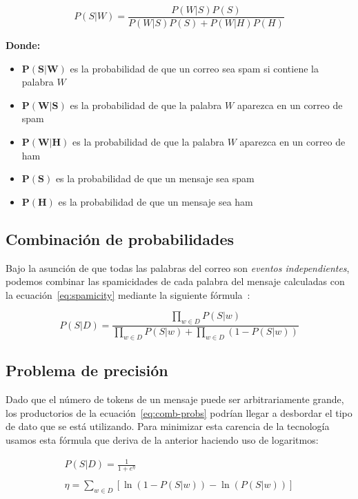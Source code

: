 \begin{equation}
	\label{eq:spamicity}
	P(S | W) = \frac{P(W | S) P(S)}{P(W | S) P(S) + P(W | H) P(H)}
\end{equation}

\textbf{Donde:}
\begin{itemize}
	\item $\bm{P(S | W)}$ es la probabilidad de que un correo sea spam si contiene la palabra $W$
	\item $\bm{P(W | S)}$ es la probabilidad de que la palabra $W$ aparezca en un correo de spam
	\item $\bm{P(W | H)}$ es la probabilidad de que la palabra $W$ aparezca en un correo de ham
	\item $\bm{P(S)}$ es la probabilidad de que un mensaje sea spam
	\item $\bm{P(H)}$ es la probabilidad de que un mensaje sea ham
\end{itemize}

\subsection{Combinación de probabilidades}

Bajo la asunción de que todas las palabras del correo son \textit{eventos
independientes}, podemos combinar las spamicidades de cada palabra del mensaje
calculadas con la ecuación~\ref{eq:spamicity} mediante la siguiente
fórmula~\cite{graham2003probability}:

\begin{equation}
	\label{eq:comb-probs}
	P(S|D) = \frac{\displaystyle\prod_{w \in D}{P(S|w)}}{\displaystyle\prod_{w \in D}{P(S|w)} + \displaystyle\prod_{w \in D}{\left(1 - P(S|w)\right)}}
\end{equation}

\subsection{Problema de precisión}

Dado que el número de tokens de un mensaje puede ser arbitrariamente grande, los
productorios de la ecuación~\ref{eq:comb-probs} podrían llegar a desbordar el
tipo de dato que se está utilizando. Para minimizar esta carencia de la
tecnología usamos esta fórmula que deriva de la anterior haciendo uso de
logaritmos:

\begin{gather}
	P(S|D) = \frac{1}{1 + e^\eta}\\\nonumber
	\\
	\eta = \sum_{w \in D}{\left[\ln\left(1 - P(S|w)\right) - \ln(P(S|w))\right]}
\end{gather}

